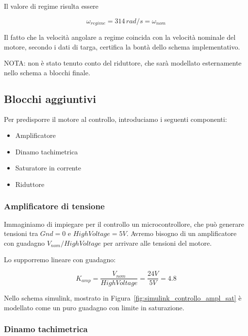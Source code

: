 \documentclass[a4paper,12pt]{article}
\begin{document}
\vspace{0.5cm}

Il valore di regime risulta essere 

\[
    \omega_{regime}= 314\,rad/s=\omega_{nom}
\]
\vspace{0.3cm}

Il fatto che la velocità angolare a regime coincida con la velocità nominale del motore, secondo i dati di targa, certifica la bontà dello schema implementativo.

NOTA: non è stato tenuto conto del riduttore, che sarà modellato esternamente nello schema a blocchi finale.


\subsection{Blocchi aggiuntivi}


Per predisporre il motore al controllo, introduciamo i seguenti componenti:

\begin{itemize}
    \item Amplificatore
    \item Dinamo tachimetrica
    \item Saturatore in corrente
    \item Riduttore
\end{itemize}

\subsubsection{Amplificatore di tensione}

Immaginiamo di impiegare per il controllo un microcontrollore, che può generare tensioni tra $Gnd = 0$ e $HighVoltage = 5V$. Avremo bisogno di un amplificatore con guadagno $V_{nom}/HighVoltage$ per arrivare alle tensioni del motore.

Lo supporremo lineare con guadagno:

\vspace{0.3cm}

\[
    K_{amp} = \frac{V_{nom}}{HighVoltage} = \frac{24V}{5V}=4.8
\]


\vspace{0.5cm}

Nello schema simulink, mostrato in Figura~\ref{fig:simulink_controllo_ampl_sat} è modellato come un puro guadagno con limite in saturazione.


\subsubsection{Dinamo tachimetrica}
\end{document}
